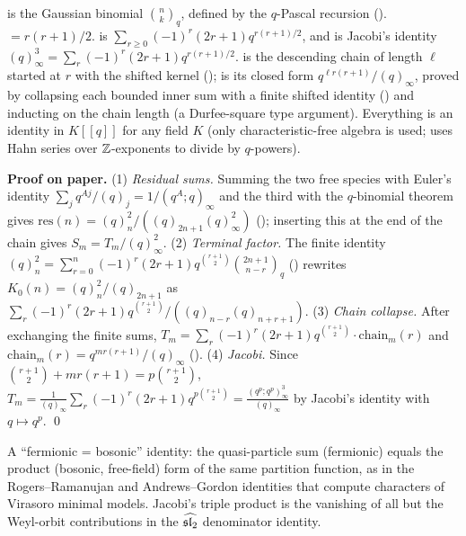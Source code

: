 \begin{dictionary}
 is the Gaussian binomial $\binom nk_q$, defined by the $q$-Pascal recursion
().  $=r(r+1)/2$.  is
$\sum_{r\ge0}(-1)^r(2r+1)q^{r(r+1)/2}$, and  is Jacobi's identity
$(q)_\infty^3=\sum_r(-1)^r(2r+1)q^{r(r+1)/2}$.  is the descending chain of length $\ell$
started at $r$ with the shifted kernel ();  is its closed form
$q^{\ell r(r+1)}/(q)_\infty$, proved by collapsing each bounded inner sum with a finite shifted identity
() and inducting on the chain length (a Durfee-square type argument). Everything is an identity in $K[[q]]$ for any field $K$ (only
characteristic-free algebra is used;  uses Hahn series over ${\mathbb{Z}}$-exponents to divide by
$q$-powers).
\end{dictionary}

\textbf{Proof on paper.} (1) \emph{Residual sums.} Summing the two free species with Euler's identity
$\sum_jq^{Aj}/(q)_j=1/(q^A;q)_\infty$ and the third with the $q$-binomial theorem gives
$\mathrm{res}(n)=(q)_n^2/((q)_{2n+1}(q)^2_\infty)$ (); inserting this at the end of the chain gives
$S_m=T_m/(q)^2_\infty$. (2) \emph{Terminal factor.} The finite identity
$(q)_n^2=\sum_{r=0}^n(-1)^r(2r+1)q^{\binom{r+1}2}\binom{2n+1}{n-r}_q$ () rewrites
$K_0(n)=(q)^2_n/(q)_{2n+1}$ as $\sum_r(-1)^r(2r+1)q^{\binom{r+1}2}/((q)_{n-r}(q)_{n+r+1})$. (3) \emph{Chain collapse.}
After exchanging the finite sums, $T_m=\sum_r(-1)^r(2r+1)q^{\binom{r+1}2}\cdot\mathrm{chain}_m(r)$ and
$\mathrm{chain}_m(r)=q^{mr(r+1)}/(q)_\infty$ (). (4) \emph{Jacobi.} Since
$\binom{r+1}2+mr(r+1)=p\binom{r+1}2$, $T_m=\frac1{(q)_\infty}\sum_r(-1)^r(2r+1)q^{p\binom{r+1}2}
=\frac{(q^p;q^p)^3_\infty}{(q)_\infty}$ by Jacobi's identity with $q\mapsto q^p$. \qed

\begin{physics}
A ``fermionic = bosonic'' identity: the quasi-particle sum (fermionic) equals the product (bosonic,
free-field) form of the same partition function, as in the Rogers--Ramanujan and Andrews--Gordon identities that
compute characters of Virasoro minimal models. Jacobi's triple product is the vanishing of all but the
Weyl-orbit contributions in the $\widehat{\mathfrak{sl}_2}$ denominator identity.
\end{physics}

